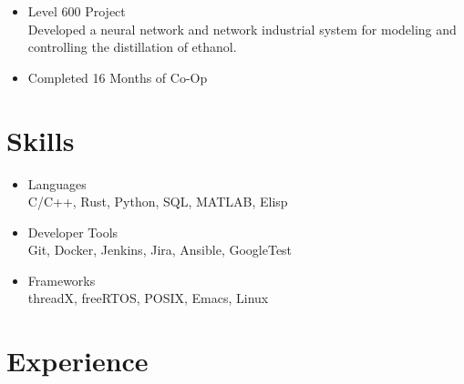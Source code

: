 \documentclass[a4paper,ragged2e,withhyper]{altacv}
\begin{document}
{\begin{itemize}
\item Level 600 Project\\
Developed a neural network and network industrial system for modeling and controlling the distillation of ethanol.\\

\item Completed 16 Months of Co-Op\\
\end{itemize}

\divider

\divider



\section{Skills}
\label{sec:orgdad1287}
\begin{itemize}
\item Languages\\
C/C++, Rust, Python, SQL, MATLAB, Elisp\\
\item Developer Tools\\
Git, Docker, Jenkins, Jira, Ansible, GoogleTest\\
\item Frameworks\\
threadX, freeRTOS, POSIX, Emacs, Linux\\
\end{itemize}

}
\section{Experience}
\label{sec:org7b8293c}
\end{document}
